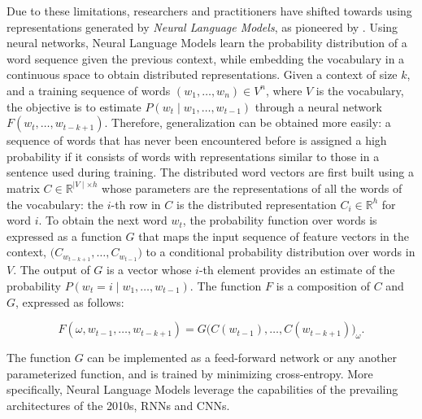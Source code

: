 Due to these limitations, researchers and practitioners have shifted towards using representations generated by \textit{Neural Language Models}, as pioneered by \citet{bengio2000neural}. Using neural networks, Neural Language Models learn the probability distribution of a word sequence given the previous context, while embedding the vocabulary in a continuous space to obtain distributed representations. Given a context of size $k$, and a training sequence of words $(w_1, \ldots, w_n) \in V^n$, where $V$ is the vocabulary, the objective is to estimate $P(w_t \mid w_1, \ldots, w_{t-1})$ through a neural network $F(w_t, \ldots, w_{t-k+1})$. Therefore, generalization can be obtained more easily: a sequence of words that has never been encountered before is assigned a high probability if it consists of words with representations similar to those in a sentence used during training. 
The distributed word vectors are first built using a matrix $C \in \mathbb{R}^{\mid V \mid \times h}$ whose parameters are the representations of all the words of the vocabulary: the $i$-th row in $C$ is the distributed representation $C_i \in \mathbb{R}^h$ for word $i$. To obtain the next word $w_t$, the probability function over words is expressed as a function $G$ that maps the input sequence of feature vectors in the context, $\bigl(C_{w_{t-k+1}}, \ldots, C_{w_{t-1}}\bigr)$ to a conditional probability distribution over words in $V$. The output of $G$ is a vector whose $i$-th element provides an estimate of the probability $P(w_t = i \mid w_1, \ldots, w_{t-1})$. The function $F$ is a composition of $C$ and $G$, expressed as follows:

\begin{equation}
    F(\omega, w_{t-1}, \ldots, w_{t-k+1}) = G\bigl(C(w_{t-1}), \ldots, C(w_{t-k+1})\bigr)_{\omega}.
\label{equation:nlm-bengio}
\end{equation}




The function $G$ can be implemented as a feed-forward network or any another parameterized function, and is trained by minimizing cross-entropy. More specifically, Neural Language Models leverage the capabilities of the prevailing architectures of the 2010s, \acp{RNN} and \acp{CNN}.

